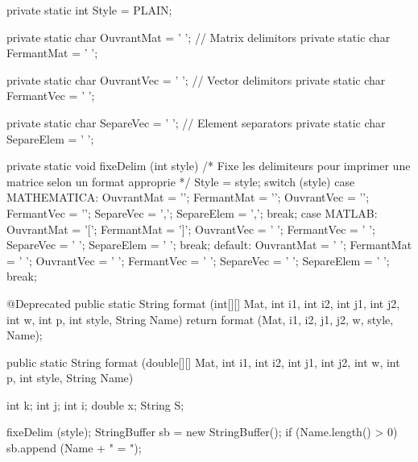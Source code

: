 \begin{code}
\begin{hide}
   private static int Style = PLAIN;

   private static char OuvrantMat = ' ';     // Matrix delimitors
   private static char FermantMat = ' ';

   private static char OuvrantVec = ' ';     // Vector delimitors
   private static char FermantVec = ' ';

   private static char SepareVec = ' ';      // Element separators
   private static char SepareElem = ' ';

   private static void fixeDelim (int style) {
      /* Fixe les delimiteurs pour imprimer une matrice selon un format
         approprie */
      Style = style;
      switch (style) {
      case MATHEMATICA:
         OuvrantMat = '{';
         FermantMat = '}';
         OuvrantVec = '{';
         FermantVec = '}';
         SepareVec = ',';
         SepareElem = ',';
         break;
      case MATLAB:
         OuvrantMat = '[';
         FermantMat = ']';
         OuvrantVec = ' ';
         FermantVec = ' ';
         SepareVec = ' ';
         SepareElem = ' ';
         break;
      default:
         OuvrantMat = ' ';
         FermantMat = ' ';
         OuvrantVec = ' ';
         FermantVec = ' ';
         SepareVec = ' ';
         SepareElem = ' ';
         break;
      }
   }


   @Deprecated
   public static String format (int[][] Mat, int i1, int i2,
                                int j1, int j2, int w, int p,
                                int style, String Name) {
      return format (Mat, i1, i2, j1, j2, w, style, Name);
   }\end{hide}

   public static String format (double[][] Mat, int i1, int i2,
                                int j1, int j2, int w, int p,
                                int style, String Name)\begin{hide} {
      int k;
      int j;
      int i;
      double x;
      String S;

      fixeDelim (style);
      StringBuffer sb = new StringBuffer();
      if (Name.length() > 0)
         sb.append (Name + " = ");

}
\end{hide}
\end{code}
